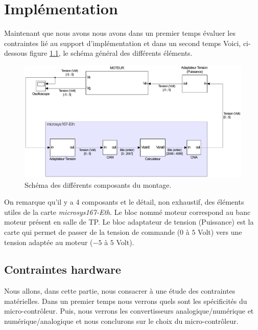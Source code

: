 \chapter{Implémentation}
\label{chap:implem}
Maintenant que nous avons nous avons dans un premier temps évaluer les contraintes lié au support d'implémentation et dans un second temps
Voici, ci-dessous figure \ref{fig:GeneralSCHEMA}, le schéma général des différents éléments.	
\begin{figure}[!ht]
\centering 
\includegraphics[width=.7\textwidth]{./V/images/schemaMO_MICRO.pdf}
\caption{\label{fig:GeneralSCHEMA}Schéma des différents composants du montage.}
\end{figure}
On remarque qu'il y a 4 composants et le détail, non exhaustif, des éléments utiles de la carte \emph{microsys167-Eth}.
Le bloc nommé moteur correspond au banc moteur présent en salle de TP. Le bloc adaptateur de tension (Puissance) est la carte qui permet de passer de la tension de commande ($0$ à $5$ Volt) vers une tension adaptée au moteur ($-5$ à $5$ Volt).
\section{Contraintes hardware} 
Nous allons, dans cette partie, nous consacrer à une étude des contraintes matérielles. Dans un premier temps nous verrons quels sont les spécificités du micro-contrôleur. Puis, nous verrons les convertisseurs analogique/numérique et numérique/analogique et nous conclurons sur le choix du micro-contrôleur. 
